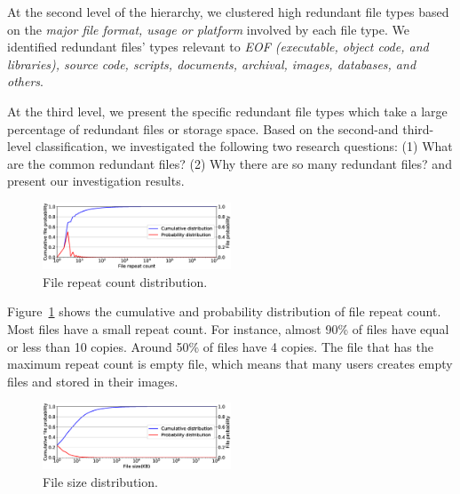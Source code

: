 At the second level of the hierarchy, we clustered high redundant file types based on the \textit{major file format, usage or platform} involved by each file type. We identified redundant files' types relevant to \textit{EOF (executable, object code, and libraries), source code, scripts, documents, archival, images, databases, and others}.

At the third level, we present the specific redundant file types which take a large percentage of redundant files or storage space.
Based on the second-and third-level classification, we investigated the following two research questions: (1) What are the common redundant files?
(2) Why there are so many redundant files? and present our investigation results.

\begin{figure}
	\centering
	\includegraphics[width=0.5\textwidth]{graphs/File_repeat_count.eps}
	\caption{File repeat count distribution.
	}
	\label{fig:file-repeat-cnt}
\end{figure}

Figure~\ref{fig:file-repeat-cnt} shows the cumulative and probability distribution of file repeat count. 
Most files have a small repeat count. For instance, almost 90\% of files have equal or less than 10 copies. Around 50\% of files have 4 copies.
The file that has the maximum repeat count is empty file, which means that many users creates empty files and stored in their images.

\begin{figure}
	\centering
	\includegraphics[width=0.5\textwidth]{graphs/File_size-KB.eps}
	\caption{File size distribution.
	}
	\label{fig:file-size}
\end{figure}

